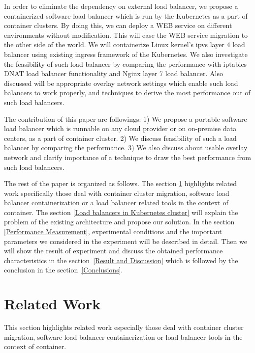 In order to eliminate the dependency on external load balancer, 
we propose a containerized software load balancer which is run by the Kubernetes as a part of container clusters.
By doing this, we can deploy a WEB service on different environments without modification.
This will ease the WEB service migration to the other side of the world. 
We will containerize Linux kernel's ipvs\cite{Zhang2000} layer 4 load balancer using existing ingress\cite{K8sIngress2017} framework of the Kubernetes. 
We also investigate the feasibility of such load balancer by comparing the performance 
with iptables DNAT load balancer functionality and Nginx layer 7 load balancer.
Also discussed will be appropriate overlay network settings which enable such load balancers to work properly, 
and techniques to derive the most performance out of such load balancers.

The contribution of this paper are followings: 
1) We propose a portable software load balancer 
which is runnable on any cloud provider or on on-premise data centers, 
as a part of container cluster.
2) We discuss feasibility of such a load balancer by comparing the performance.
3) We also discuss about usable overlay network and clarify importance of a technique 
to draw the best performance from such load balancers.  

The rest of the paper is organized as follows.
The section \ref{Related Work} highlights related work specifically those deal with container cluster migration, 
software load balancer containerization or a load balancer related tools in the context of container. 
The section \ref{Load balancers in Kubernetes cluster} will explain the problem of the existing architecture and propose our solution.
In the section \ref{Performance Measurement}, experimental conditions and the important parameters 
we considered in the experiment will be described in detail.
Then we will show the result of experiment and discuss the obtained performance characteristics in the section~\ref{Result and Discussion} 
which is followed by the conclusion in the section~\ref{Conclusions}.
  

\section{Related Work}\label{Related Work}
This section highlights related work especially those deal with container cluster migration, 
software load balancer containerization or load balancer tools in the context of container. 

